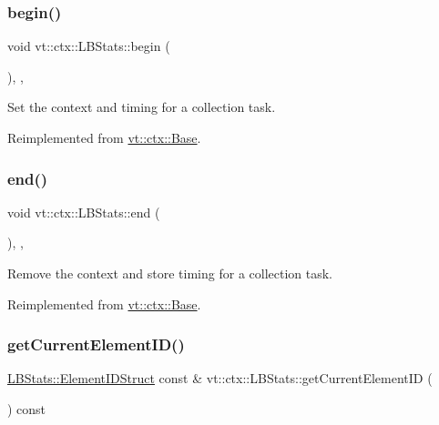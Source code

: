 \subsubsection{\texorpdfstring{begin()}{begin()}}
{\footnotesize\ttfamily void vt\+::ctx\+::\+L\+B\+Stats\+::begin (\begin{DoxyParamCaption}{ }\end{DoxyParamCaption})\hspace{0.3cm}{\ttfamily [final]}, {\ttfamily [override]}, {\ttfamily [virtual]}}



Set the context and timing for a collection task. 



Reimplemented from \hyperlink{structvt_1_1ctx_1_1_base_aab5524952e1bb163ccba5df64a303168}{vt\+::ctx\+::\+Base}.

\mbox{\label{structvt_1_1ctx_1_1_l_b_stats_a55efc4d1d6eb579943b5b39d2a823328}} 
\subsubsection{\texorpdfstring{end()}{end()}}
{\footnotesize\ttfamily void vt\+::ctx\+::\+L\+B\+Stats\+::end (\begin{DoxyParamCaption}{ }\end{DoxyParamCaption})\hspace{0.3cm}{\ttfamily [final]}, {\ttfamily [override]}, {\ttfamily [virtual]}}



Remove the context and store timing for a collection task. 



Reimplemented from \hyperlink{structvt_1_1ctx_1_1_base_a113bac732b2831caa8eed11609ccaf0e}{vt\+::ctx\+::\+Base}.

\mbox{\label{structvt_1_1ctx_1_1_l_b_stats_acfcb5bb3b554fa1992525ec04d46b69e}} 
\subsubsection{\texorpdfstring{get\+Current\+Element\+I\+D()}{getCurrentElementID()}}
{\footnotesize\ttfamily \hyperlink{structvt_1_1ctx_1_1_l_b_stats_a2ba0297a3c99e495b74b73abbf888bde}{L\+B\+Stats\+::\+Element\+I\+D\+Struct} const  \& vt\+::ctx\+::\+L\+B\+Stats\+::get\+Current\+Element\+ID (\begin{DoxyParamCaption}{ }\end{DoxyParamCaption}) const}



